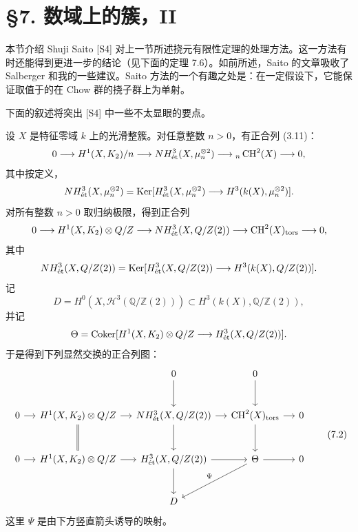 \section*{§7. 数域上的簇，II}
本节介绍 Shuji Saito [S4] 对上一节所述挠元有限性定理的处理方法。这一方法有时还能得到更进一步的结论（见下面的定理 7.6）。如前所述，Saito 的文章吸收了 Salberger 和我的一些建议。Saito 方法的一个有趣之处是：在一定假设下，它能保证取值于的在 Chow 群的挠子群上为单射。

下面的叙述将突出 [S4] 中一些不太显眼的要点。

设 $X$ 是特征零域 $k$ 上的光滑整簇。对任意整数 $n>0$，有正合列 (3.11)：
\[
 0\longrightarrow H^1(X,K_2)/n
 \longrightarrow NH^3_{\mathrm{\acute et}}(X,\mu_n^{\otimes2})
 \longrightarrow {}_n\operatorname{CH}^2(X)\longrightarrow0,
\]
其中按定义，
\[
 NH^3_{\mathrm{\acute et}}(X,\mu_n^{\otimes2})
 =\operatorname{Ker}[H^3_{\mathrm{\acute et}}(X,\mu_n^{\otimes2})
       \longrightarrow H^3(k(X),\mu_n^{\otimes2})].
\]
对所有整数 $n>0$ 取归纳极限，得到正合列
\[
 0\longrightarrow H^1(X,K_2)\otimes Q/Z
 \longrightarrow NH^3_{\mathrm{\acute et}}(X,Q/Z(2))
 \longrightarrow\operatorname{CH}^2(X)_{\mathrm{tors}}\longrightarrow0,
\]
其中
\[
 NH^3_{\mathrm{\acute et}}(X,Q/Z(2))
 =\operatorname{Ker}[H^3_{\mathrm{\acute et}}(X,Q/Z(2))
       \longrightarrow H^3(k(X),Q/Z(2))].
\]
记
\[
 D=H^0(X,\mathcal H^3(\mathbb Q/\mathbb Z(2)))
 \subset H^3(k(X),\mathbb Q/\mathbb Z(2)),
\]
并记
\[
 \Theta=\operatorname{Coker}[H^1(X,K_2)\otimes Q/Z
                \longrightarrow H^3_{\mathrm{\acute et}}(X,Q/Z(2))].
\]
于是得到下列显然交换的正合列图：
\begin{equation*}
\begin{tikzcd}[ampersand replacement=\&,column sep=small,row sep=large]
 \&\&0\arrow[d]\&0\arrow[d]\\
 0\arrow[r]\&H^1(X,\mathcal K_2)\otimes\mathbb Q/\mathbb Z\arrow[r]\arrow[d,equal]
 \&NH^3_{\et}(X,\mathbb Q/\mathbb Z(2))\arrow[r]\arrow[d]
 \&\CH^2(X)_{\tors}\arrow[r]\arrow[d]\&0\\
 0\arrow[r]\&H^1(X,\mathcal K_2)\otimes\mathbb Q/\mathbb Z\arrow[r]
 \&H^3_{\et}(X,\mathbb Q/\mathbb Z(2))\arrow[r]\arrow[d]
 \&\Theta\arrow[r]\arrow[dl,"{\Psi}"']\&0\\
 \&\&D
\end{tikzcd}
\tag{7.2}
\end{equation*}
这里 $\Psi$ 是由下方竖直箭头诱导的映射。

